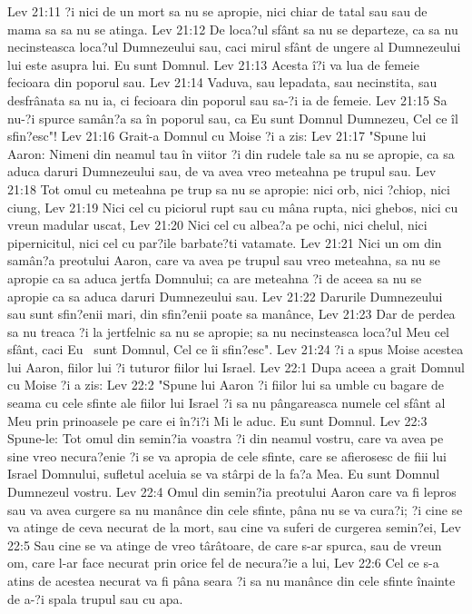 Lev 21:11  ?i nici de un mort sa nu se apropie, nici chiar de tatal sau sau de mama sa sa nu se atinga.
Lev 21:12  De loca?ul sfânt sa nu se departeze, ca sa nu necinsteasca loca?ul Dumnezeului sau, caci mirul sfânt de ungere al Dumnezeului lui este asupra lui. Eu sunt Domnul.
Lev 21:13  Acesta î?i va lua de femeie fecioara din poporul sau.
Lev 21:14  Vaduva, sau lepadata, sau necinstita, sau desfrânata sa nu ia, ci fecioara din poporul sau sa-?i ia de femeie.
Lev 21:15  Sa nu-?i spurce samân?a sa în poporul sau, ca Eu sunt Domnul Dumnezeu, Cel ce îl sfin?esc"!
Lev 21:16  Grait-a Domnul cu Moise ?i a zis:
Lev 21:17  "Spune lui Aaron: Nimeni din neamul tau în viitor ?i din rudele tale sa nu se apropie, ca sa aduca daruri Dumnezeului sau, de va avea vreo meteahna pe trupul sau.
Lev 21:18  Tot omul cu meteahna pe trup sa nu se apropie: nici orb, nici ?chiop, nici ciung,
Lev 21:19  Nici cel cu piciorul rupt sau cu mâna rupta, nici ghebos, nici cu vreun madular uscat,
Lev 21:20  Nici cel cu albea?a pe ochi, nici chelul, nici pipernicitul, nici cel cu par?ile barbate?ti vatamate.
Lev 21:21  Nici un om din samân?a preotului Aaron, care va avea pe trupul sau vreo meteahna, sa nu se apropie ca sa aduca jertfa Domnului; ca are meteahna ?i de aceea sa nu se apropie ca sa aduca daruri Dumnezeului sau.
Lev 21:22  Darurile Dumnezeului sau sunt sfin?enii mari, din sfin?enii poate sa manânce,
Lev 21:23  Dar de perdea sa nu treaca ?i la jertfelnic sa nu se apropie; sa nu necinsteasca loca?ul Meu cel sfânt, caci Eu  sunt Domnul, Cel ce îi sfin?esc".
Lev 21:24  ?i a spus Moise acestea lui Aaron, fiilor lui ?i tuturor fiilor lui Israel.
Lev 22:1  Dupa aceea a grait Domnul cu Moise ?i a zis:
Lev 22:2  "Spune lui Aaron ?i fiilor lui sa umble cu bagare de seama cu cele sfinte ale fiilor lui Israel ?i sa nu pângareasca numele cel sfânt al Meu prin prinoasele pe care ei în?i?i Mi le aduc. Eu sunt Domnul.
Lev 22:3  Spune-le: Tot omul din semin?ia voastra ?i din neamul vostru, care va avea pe sine vreo necura?enie ?i se va apropia de cele sfinte, care se afierosesc de fiii lui Israel Domnului, sufletul aceluia se va stârpi de la fa?a Mea. Eu sunt Domnul Dumnezeul vostru.
Lev 22:4  Omul din semin?ia preotului Aaron care va fi lepros sau va avea curgere sa nu manânce din cele sfinte, pâna nu se va cura?i; ?i cine se va atinge de ceva necurat de la mort, sau cine va suferi de curgerea semin?ei,
Lev 22:5  Sau cine se va atinge de vreo târâtoare, de care s-ar spurca, sau de vreun om, care l-ar face necurat prin orice fel de necura?ie a lui,
Lev 22:6  Cel ce s-a atins de acestea necurat va fi pâna seara ?i sa nu manânce din cele sfinte înainte de a-?i spala trupul sau cu apa.
